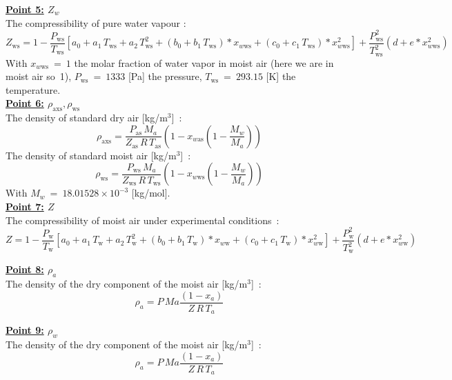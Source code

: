 \textbf{\underline{Point 5:} $Z_w$}\\
The compressibility of pure water vapour :
\begin{equation}
	Z_\text{ws} = 1-\frac{P_\text{ws}}{T_\text{ws}}\left[a_0+a_1\,T_\text{ws}+a_2\,T_\text{ws}^2+\left(b_0+b_1\,T_\text{ws}\right)*x_{w\text{ws}} +(c_0+c_1\,T_\text{ws})*x_{w\text{ws}}^2\right] +\frac{P_\text{ws}^2}{T_\text{ws}^2}\left(d+e*x_{w\text{ws}}^2\right)\label{eq:Zw}
\end{equation}
With $x_{w\text{ws}}~=~1$ the molar fraction of water vapor in moist air (here we are in moist air so~1), $P_\text{ws}~=~1333$ [Pa] the pressure, $T_\text{ws}~=~293.15$ [K] the temperature.\\

\textbf{\underline{Point 6:} $\rho_\text{axs}, \rho_\text{ws}$}\\
The density of standard dry air [kg/m$^3$]~:
\begin{equation}
	\rho_\text{axs} = \frac{P_\text{as}\,M_a}{Z_\text{as}\,R\,T_\text{as}}\left(1-x_{w\text{as}}\left(1-\frac{M_w}{M_a}\right)\right)
\end{equation}
The density of standard moist air [kg/m$^3$]~:
\begin{equation}
	\rho_\text{ws} = \frac{P_\text{ws}\,M_a}{Z_\text{ws}\,R\,T_\text{ws}}\left(1-x_{w\text{ws}}\left(1-\frac{M_w}{M_a}\right)\right)
\end{equation}
With $M_w~=~18.01528\times10^{-3}$ [kg/mol].\\

\textbf{\underline{Point 7:} $Z$}\\
The compressibility of moist air under experimental conditions~:
\begin{equation}
	Z = 1-\frac{P_\text{w}}{T_\text{w}}\left[a_0+a_1\,T_\text{w}+a_2\,T_\text{w}^2+\left(b_0+b_1\,T_\text{w}\right)*x_{w\text{w}} +(c_0+c_1\,T_\text{w})*x_{w\text{w}}^2\right] +\frac{P_\text{w}^2}{T_\text{w}^2}\left(d+e*x_{w\text{w}}^2\right)\label{eq:Zw}
\end{equation}

\textbf{\underline{Point 8:} $\rho_a$}\\
The density of the dry component of the moist air [kg/m$^3$]~:
\begin{equation}
	\rho_a = P\,Ma\frac{\left(1-x_a\right)}{Z\,R\,T_a}\label{eq:rho_a}
\end{equation}

\textbf{\underline{Point 9:} $\rho_w$}\\
The density of the dry component of the moist air [kg/m$^3$]~:
\begin{equation}
	\rho_a = P\,Ma\frac{\left(1-x_a\right)}{Z\,R\,T_a}\label{eq:rho_a}
\end{equation}

